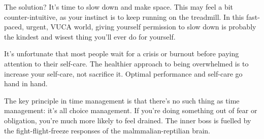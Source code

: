 \documentclass[ebook,12pt,oneside,openany]{memoir}
\begin{document}
The solution? It's time to slow down and make space. This may feel a bit counter-intuitive, as your instinct is to keep running on the treadmill.
In this fast-paced, urgent, VUCA world, giving yourself permission to slow down is probably the kindest and wisest thing you'll ever do for yourself.

It's unfortunate that most people wait for a crisis or burnout before paying attention to their self-care.
The healthier approach to being overwhelmed is to increase your self-care, not sacrifice it.
Optimal performance and self-care go hand in hand. 

The key principle in time management is that there's no such thing as time management: it's all choice management.
If you're doing something out of fear or obligation, you're much more likely to feel drained. 
The inner boss is fuelled by the fight-flight-freeze responses of the malmmalian-reptilian brain.
\end{document}
